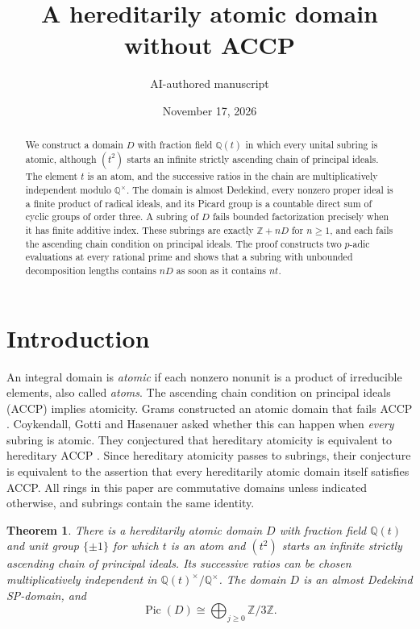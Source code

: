 \documentclass[11pt, letterpaper]{article}
\title{A hereditarily atomic domain without ACCP}
\author{AI-authored manuscript}
\date{November 17, 2026}
\newtheorem{maintheorem}{Theorem}
\theoremstyle{definition}
\theoremstyle{remark}
\begin{document}
\maketitle

\begin{abstract}
    We construct a domain $D$ with fraction field $\mathbb{Q}(t)$ in which every unital subring is atomic, although $(t^2)$ starts an infinite strictly ascending chain of principal ideals.
    The element $t$ is an atom, and the successive ratios in the chain are multiplicatively independent modulo $\mathbb{Q}^{\times}$.
    The domain is almost Dedekind, every nonzero proper ideal is a finite product of radical ideals, and its Picard group is a countable direct sum of cyclic groups of order three.
    A subring of $D$ fails bounded factorization precisely when it has finite additive index.
    These subrings are exactly $\mathbb{Z} + nD$ for $n \ge 1$, and each fails the ascending chain condition on principal ideals.
    The proof constructs two $p$-adic evaluations at every rational prime and shows that a subring with unbounded decomposition lengths contains $nD$ as soon as it contains $nt$.
\end{abstract}

\section{Introduction}
\label{sec:intro}

An integral domain is \emph{atomic} if each nonzero nonunit is a product of irreducible elements, also called \emph{atoms}.
The ascending chain condition on principal ideals (ACCP) implies atomicity.
Grams constructed an atomic domain that fails ACCP \cite[Theorem~1.3]{Grams}.
Coykendall, Gotti and Hasenauer asked whether this can happen when \emph{every} subring is atomic.
They conjectured that hereditary atomicity is equivalent to hereditary ACCP \cite[Conjecture~6.1]{CGH}.
Since hereditary atomicity passes to subrings, their conjecture is equivalent to the assertion that every hereditarily atomic domain itself satisfies ACCP.
All rings in this paper are commutative domains unless indicated otherwise, and subrings contain the same identity.

\begin{maintheorem}
    \label{thm:main}
    There is a hereditarily atomic domain $D$ with fraction field $\mathbb{Q}(t)$ and unit group $\{\pm 1\}$ for which $t$ is an atom and $(t^2)$ starts an infinite strictly ascending chain of principal ideals.
    Its successive ratios can be chosen multiplicatively independent in $\mathbb{Q}(t)^{\times}/\mathbb{Q}^{\times}$.
    The domain $D$ is an almost Dedekind SP-domain, and
    \[
        \operatorname{Pic}(D) \cong \bigoplus_{j \ge 0} \mathbb{Z}/3\mathbb{Z}.
    \]
\end{maintheorem}
\end{document}
